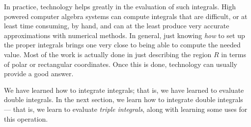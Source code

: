 In practice, technology helps greatly in the evaluation of such integrals. High powered computer algebra systems can compute integrals that are difficult, or at least time consuming, by hand, and can at the least produce very accurate approximations with numerical methods. In general, just knowing \emph{how} to set up the proper integrals brings one very close to being able to compute the needed value. Most of the work is actually done in just describing the region $R$ in terms of polar or rectangular coordinates. Once this is done, technology can usually provide a good answer.\bigskip

We have learned how to integrate integrals; that is, we have learned to evaluate double integrals. In the next section, we learn how to integrate double integrals --- that is, we learn to evaluate \emph{triple integrals}, along with learning some uses for this operation.

